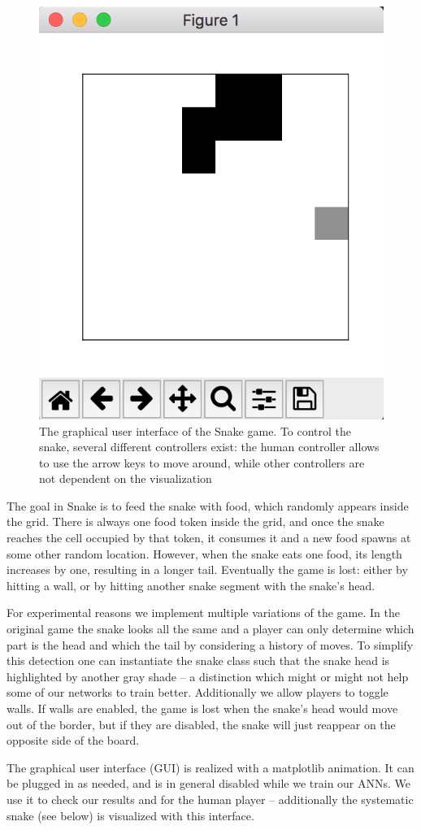 \documentclass[a4paper]{article}
\begin{document}
\begin{figure}
  \centering
  \includegraphics[width=.5\textwidth]{SnakeBoard.png}
  \caption{\label{fig:sboard}The graphical user interface of the Snake game. To control the snake, several different controllers exist: the human controller allows to use the arrow keys to move around, while other controllers are not dependent on the visualization}
\end{figure}

The goal in Snake is to feed the snake with food, which randomly appears inside the grid. There is always one food token inside the grid, and once the snake reaches the cell occupied by that token, it consumes it and a new food spawns at some other random location. However, when the snake eats one food, its length increases by one, resulting in a longer tail. Eventually the game is lost: either by hitting a wall, or by hitting another snake segment with the snake's head.

For experimental reasons we implement multiple variations of the game. In the original game the snake looks all the same and a player can only determine which part is the head and which the tail by considering a history of moves. To simplify this detection one can instantiate the snake class such that the snake head is highlighted by another gray shade -- a distinction which might or might not help some of our networks to train better. Additionally we allow players to toggle walls. If walls are enabled, the game is lost when the snake's head would move out of the border, but if they are disabled, the snake will just reappear on the opposite side of the board.

The graphical user interface (GUI) is realized with a matplotlib\cite{Hunter:2007} animation. It can be plugged in as needed, and is in general disabled while we train our ANNs. We use it to check our results and for the human player -- additionally the systematic snake (see below) is visualized with this interface.
\end{document}
